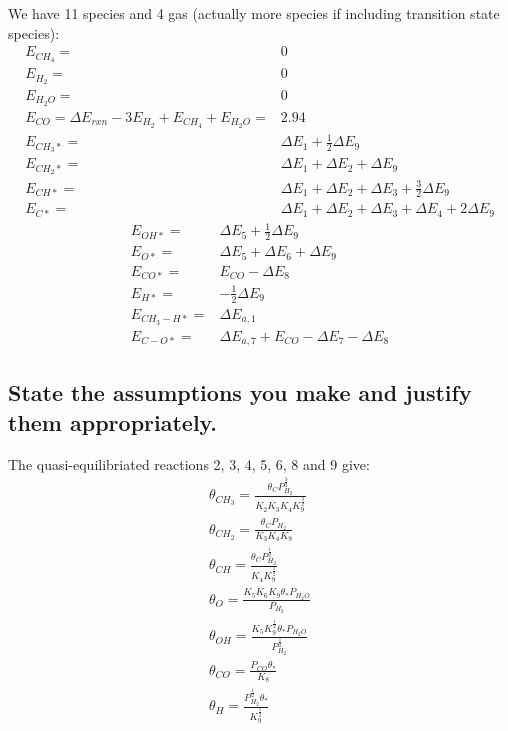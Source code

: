 \documentclass{article}
\begin{document}
    We have 11 species and 4 gas (actually more species if including transition state species):
    \begin{eqnarray}
        E_{CH_{4}} =& 0 \nonumber \\
        E_{H_2} =& 0 \nonumber \\
        E_{H_{2}O} =& 0 \nonumber \\
        E_{CO} = \Delta E_{rxn} - 3 E_{H_{2}} + E_{CH_{4}} + E_{H_{2}O} =& 2.94 \nonumber \\
        E_{CH_3*} =& \Delta E_1 + \frac{1}{2}\Delta E_9 \nonumber \\
        E_{CH_2*} =& \Delta E_1 + \Delta E_2  + \Delta E_9 \nonumber \\
        E_{CH*} =& \Delta E_1 + \Delta E_2 + \Delta E_3 + \frac{3}{2}\Delta E_9 \nonumber \\
        E_{C*} =& \Delta E_1 + \Delta E_2 + \Delta E_3 + \Delta E_4 + 2\Delta E_9 \nonumber
    \end{eqnarray}
    \begin{eqnarray}
        E_{OH*} =& \Delta E_5 + \frac{1}{2}\Delta E_9 \nonumber \\
        E_{O*} =& \Delta E_5 + \Delta E_6 + \Delta E_9 \nonumber \\
        E_{CO*} =& E_{CO} - \Delta E_8 \nonumber \\
        E_{H*} =& - \frac{1}{2}\Delta E_9 \nonumber \\
        E_{CH_{3}-H*} =& \Delta E_{a,1} \nonumber \\
        E_{C-O*} =& \Delta E_{a,7} + E_{CO} - \Delta E_7 - \Delta E_8 \nonumber
    \end{eqnarray}
    \subsection*{State the assumptions you make and justify them appropriately.}
    The quasi-equilibriated reactions 2, 3, 4, 5, 6, 8 and 9 give:
\begin{eqnarray}
    \theta_{CH_{3}}= \frac{\theta_{C} P_{H_2}^{\frac{3}{2}}}{K_{2} K_{3} K_{4} K_{9}^{\frac{3}{2}}}  \\
    \theta_{CH_{2}}= \frac{\theta_{C} P_{H_2}}{K_{3} K_{4} K_{9}}   \\
    \theta_{CH}= \frac{\theta_{C} P_{H_2}^{\frac{1}{2}}}{K_{4} K_{9}^{\frac{1}{2}}}   \\
    \theta_{O}= \frac{K_{5} K_{6} K_{9} \theta_{*} P_{H_{2}O}}{P_{H_2}}   \\
    \theta_{OH}= \frac{K_{5} K_{9}^{\frac{1}{2}} \theta_{*} P_{H_{2}O}}{P_{H_2}^\frac{1}{2}}   \\
    \theta_{CO}= \frac{P_{CO} \theta_{*}}{K_{8}}   \\
    \theta_{H}= \frac{P_{H_2}^{\frac{1}{2}} \theta_{*}}{K_{9}^\frac{1}{2}}
\end{eqnarray}
\end{document}
